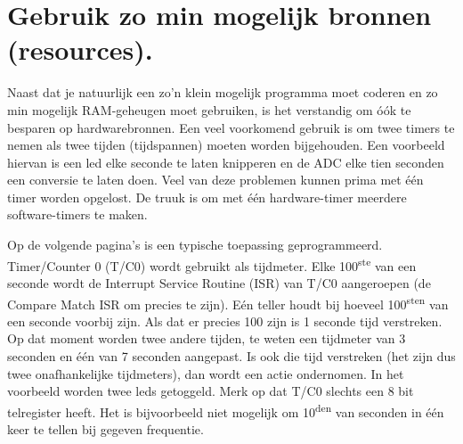 \documentclass[12pt,a4paper,final,twoside,fleqn]{article}
\begin{document}
\section{Gebruik zo min mogelijk bronnen (resources).}
Naast dat je natuurlijk een zo'n klein mogelijk programma moet coderen en zo min
mogelijk RAM-geheugen moet gebruiken, is het verstandig om \'{o}\'{o}k te
besparen op hardwarebronnen. Een veel voorkomend gebruik is om twee timers
te nemen als twee tijden (tijdspannen) moeten worden bijgehouden. Een voorbeeld
hiervan is een led elke seconde te laten knipperen en de ADC elke tien seconden
een conversie te laten doen. Veel van deze problemen kunnen prima met
\'{e}\'{e}n timer worden opgelost. De truuk is om met \'{e}\'{e}n
hardware-timer meerdere software-timers te maken.

Op de volgende pagina's is een typische toepassing geprogrammeerd. Timer/Counter
0 (T/C0) wordt gebruikt als tijdmeter. Elke 100\textsuperscript{ste} van een
seconde wordt de Interrupt Service Routine (ISR) van T/C0 aangeroepen (de Compare
Match ISR om precies te zijn). E\'{e}n teller houdt bij hoeveel
100\textsuperscript{sten} van een seconde voorbij zijn. Als dat er precies 100
zijn is 1 seconde tijd verstreken. Op dat moment worden twee andere tijden, te
weten een tijdmeter van 3 seconden en \'{e}\'{e}n van 7 seconden aangepast. Is
ook die tijd verstreken (het zijn dus twee onafhankelijke tijdmeters), dan wordt
een actie ondernomen. In het voorbeeld worden twee leds getoggeld. Merk op dat
T/C0 slechts een 8 bit telregister heeft. Het is bijvoorbeeld niet mogelijk om
10\textsuperscript{den} van seconden in \'{e}\'{e}n keer te tellen bij gegeven
frequentie.
\end{document}
